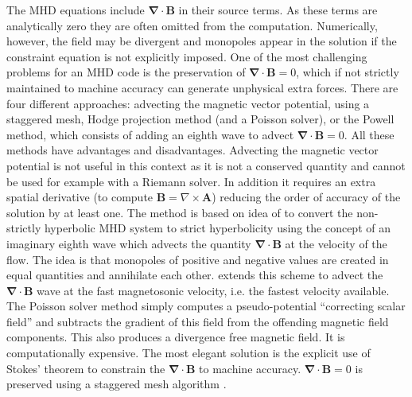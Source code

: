 
The MHD equations include $\boldsymbol{\nabla} \cdot \mathbf{B} $ in their source terms.
As these terms are analytically zero they are often omitted from the
computation. Numerically, however, the field may be divergent and monopoles appear in the solution if the constraint equation is not explicitly imposed.
One of the most challenging problems for an MHD code is the preservation of $\boldsymbol{\nabla} \cdot \mathbf{B} =0$, which if not strictly maintained to machine accuracy can generate unphysical extra forces.
There are four different approaches: advecting the magnetic vector potential, using a staggered mesh, Hodge projection method (and a Poisson solver), or the Powell method, which consists of adding an eighth wave to advect $\boldsymbol{\nabla} \cdot \mathbf{B}=0$.
All these methods have advantages and disadvantages.
Advecting the magnetic vector potential is not useful in this context as it is not a conserved quantity and cannot be used for example with a Riemann solver.
In addition it requires an extra spatial derivative (to compute $\mathbf{B}=\nabla \times \mathbf{A} $) reducing the order of accuracy of the solution by at least one.
The \citet{1999JCoPh.154..284P} method is based on idea of \citet{Go75} to convert the non-strictly hyperbolic MHD system to strict hyperbolicity using the concept of an imaginary eighth wave which advects the quantity $\boldsymbol{\nabla} \cdot \mathbf{B} $ at the velocity of the flow. 
The idea is that monopoles of positive and negative values are created in equal quantities and annihilate each other. 
\citet{2002JCoPh.175..645D} extends this scheme to advect the $\boldsymbol{\nabla} \cdot \mathbf{B}$ wave at the fast magnetosonic velocity, i.e. the fastest velocity available.
The Poisson solver method simply computes a pseudo-potential ``correcting scalar field'' and subtracts the gradient of this field from the offending magnetic field components. 
This also produces a divergence free magnetic field.
It is computationally expensive.
The most elegant solution is the explicit use of Stokes' theorem to constrain the $\boldsymbol{\nabla} \cdot \mathbf{B}$ to machine accuracy.
$\boldsymbol{\nabla} \cdot \mathbf{B}=0$ is preserved using a staggered mesh algorithm \citep{307327}. 

